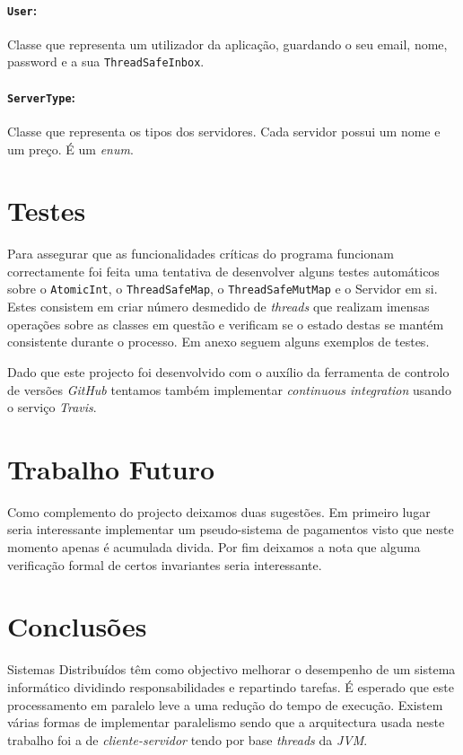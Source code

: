 \documentclass[a4paper]{article}
\begin{document}
\paragraph{\texttt{User}:}
Classe que representa um utilizador da aplicação, guardando o seu email, nome, password e a sua \texttt{ThreadSafeInbox}.

\paragraph{\texttt{ServerType}:}
Classe que representa os tipos dos servidores. Cada servidor possui um nome e um preço. É um \textit{enum}.

\section{Testes}
Para assegurar que as funcionalidades críticas do programa funcionam correctamente foi feita uma tentativa de desenvolver alguns testes automáticos sobre o \texttt{AtomicInt}, o \texttt{ThreadSafeMap}, o \texttt{ThreadSafeMutMap} e o Servidor em si. Estes consistem em criar número desmedido de \textit{threads} que realizam imensas operações sobre as classes em questão e verificam se o estado destas se mantém consistente durante o processo. Em anexo seguem alguns exemplos de testes.

Dado que este projecto foi desenvolvido com o auxílio da ferramenta de controlo de versões \textit{GitHub} tentamos também implementar \textit{continuous integration} usando o serviço \textit{Travis}.

\section{Trabalho Futuro}

Como complemento do projecto deixamos duas sugestões.
Em primeiro lugar seria interessante implementar um pseudo-sistema de pagamentos visto que neste momento apenas é acumulada divida.
Por fim deixamos a nota que alguma verificação formal de certos invariantes seria interessante.

\section{Conclusões}
Sistemas Distribuídos têm como objectivo melhorar o desempenho de um sistema informático dividindo responsabilidades e repartindo tarefas. É esperado que este processamento em paralelo leve a uma redução do tempo de execução.
Existem várias formas de implementar paralelismo sendo que a arquitectura usada neste trabalho foi a de \textit{cliente-servidor} tendo por base \textit{threads} da \textit{JVM}. 
\end{document}
